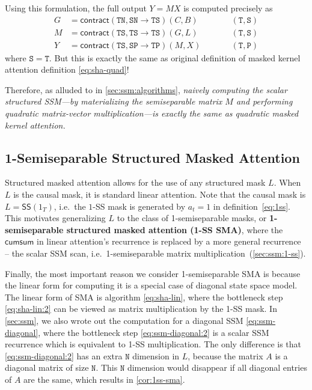 \documentclass{article}
\begin{document}
Using this formulation, the full output $Y=MX$ is computed precisely as
\begin{equation}
  \label{eq:ssm-quad}
  \begin{aligned}
    G     & = \mathsf{contract}(\mathtt{TN, SN \to TS})(C, B) & & \qquad \mathtt{(T,S)} \\
    M     & = \mathsf{contract}(\mathtt{TS, TS \to TS})(G, L) & & \qquad \mathtt{(T,S)} \\
    Y     & = \mathsf{contract}(\mathtt{TS, SP \to TP})(M, X) & & \qquad \mathtt{(T,P)}
  \end{aligned}
\end{equation}
where $\mathtt{S}=\mathtt{T}$.
But this is exactly the same as original definition of masked kernel attention definition \eqref{eq:sha-quad}!

Therefore, as alluded to in \cref{sec:ssm:algorithms},
\emph{naively computing the scalar structured SSM---by materializing the semiseparable matrix $M$ and performing quadratic matrix-vector multiplication---is exactly the same as quadratic masked kernel attention.}

\subsection{1-Semiseparable Structured Masked Attention}
\label{sec:ssd:1ss-sma}

Structured masked attention allows for the use of any structured mask $L$.
When $L$ is the causal mask, it is standard linear attention.
Note that the causal mask is $L = \mathsf{SS}(1_T)$, i.e.\ the $1$-SS mask is generated by $a_t=1$ in definition~\eqref{eq:1ss}.
This motivates generalizing $L$ to the class of 1-semiseparable masks, or \textbf{1-semiseparable structured masked attention (1-SS SMA)},
where the $\mathsf{cumsum}$ in linear attention's recurrence is replaced by a more general recurrence -- the scalar SSM scan, i.e.\ 1-semiseparable matrix multiplication~(\cref{sec:ssm:1-ss}).

Finally, the most important reason we consider 1-semiseparable SMA is because the linear form for computing it is a special case of diagonal state space model.
The linear form of SMA is algorithm \eqref{eq:sha-lin}, where the bottleneck step \eqref{eq:sha-lin:2} can be viewed as matrix multiplication by the 1-SS mask.
In \cref{sec:ssm}, we also wrote out the computation for a diagonal SSM \eqref{eq:ssm-diagonal}, where the bottleneck step \eqref{eq:ssm-diagonal:2} is a scalar SSM recurrence which is equivalent to 1-SS multiplication.
The only difference is that \eqref{eq:ssm-diagonal:2} has an extra $\mathtt{N}$ dimension in $L$, because the matrix $A$ is a diagonal matrix of size $\mathtt{N}$.
This $\mathtt{N}$ dimension would disappear if all diagonal entries of $A$ are the same,
which results in \cref{cor:1ss-sma}.
\end{document}
